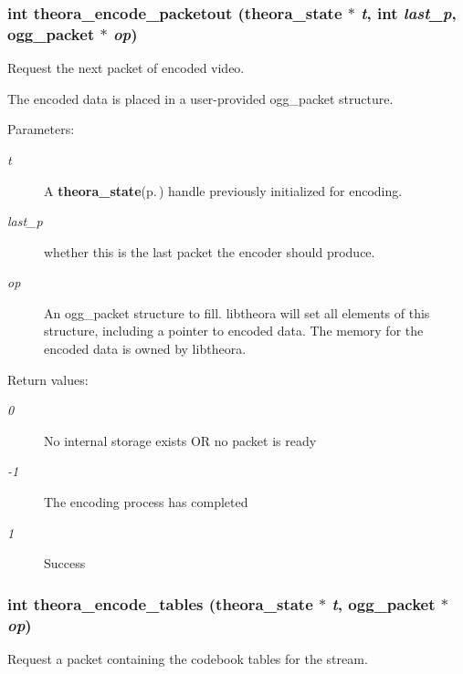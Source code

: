 \subsubsection{\setlength{\rightskip}{0pt plus 5cm}int theora\_\-encode\_\-packetout ({\bf theora\_\-state} $\ast$ {\em t}, int {\em last\_\-p}, ogg\_\-packet $\ast$ {\em op})}\label{theora_8h_a17}


Request the next packet of encoded video. 

The encoded data is placed in a user-provided ogg\_\-packet structure. \begin{Desc}
\item[Parameters:]
\begin{description}
\item[{\em t}]A {\bf theora\_\-state}{\rm (p.\,\pageref{structtheora__state})} handle previously initialized for encoding. \item[{\em last\_\-p}]whether this is the last packet the encoder should produce. \item[{\em op}]An ogg\_\-packet structure to fill. libtheora will set all elements of this structure, including a pointer to encoded data. The memory for the encoded data is owned by libtheora. \end{description}
\end{Desc}
\begin{Desc}
\item[Return values:]
\begin{description}
\item[{\em 0}]No internal storage exists OR no packet is ready \item[{\em -1}]The encoding process has completed \item[{\em 1}]Success \end{description}
\end{Desc}
\subsubsection{\setlength{\rightskip}{0pt plus 5cm}int theora\_\-encode\_\-tables ({\bf theora\_\-state} $\ast$ {\em t}, ogg\_\-packet $\ast$ {\em op})}\label{theora_8h_a20}


Request a packet containing the codebook tables for the stream. 

